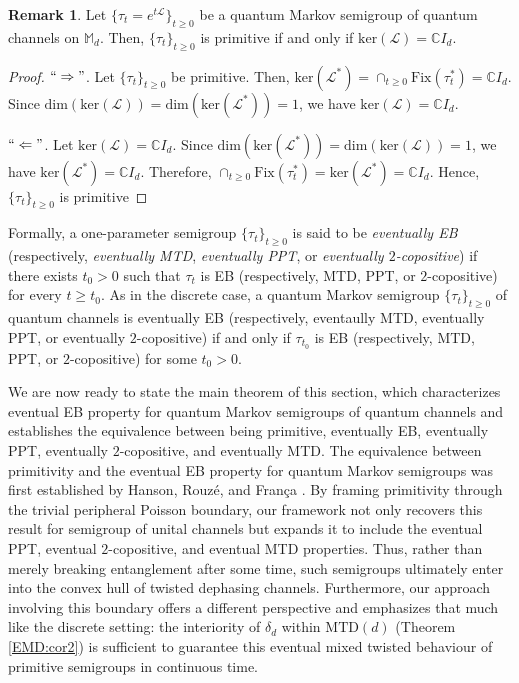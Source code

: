 \documentclass[11pt,reqno]{amsart}
\theoremstyle{definition}
\newtheorem{rmk}[defn]{Remark}
\theoremstyle{plain}
\theoremstyle{remark}
\numberwithin{equation}{section}%
\begin{document}
  
   \begin{rmk}\label{EMD:rem1}
  	Let $\{\tau_t = e^{t\mathcal{L}}\}_{t \ge 0}$ be a quantum Markov semigroup of quantum channels on $\mathbb{M}_d$. Then, $\{\tau_t\}_{t\geq 0}$ is primitive if and only if $\text{ker}(\mathcal{L})=\mathbb{C}I_d$.
  \end{rmk}
  
  
  \begin{proof}
  	$``\Rightarrow"$. Let $\{\tau_t\}_{t\geq 0}$ be primitive. Then, $\text{ker}(\mathcal{L}^*)=\cap_{t\geq 0}\text{Fix}(\tau_t^*)=\mathbb{C}I_d$. Since $\text{dim}(\text{ker}(\mathcal{L}))=\text{dim}(\text{ker}(\mathcal{L}^*))=1$, we have $\text{ker}(\mathcal{L})=\mathbb{C}I_d$.
  	
  	$``\Leftarrow"$. Let $\text{ker}(\mathcal{L})=\mathbb{C}I_d$. Since $\text{dim}(\text{ker}(\mathcal{L^*}))=\text{dim}(\text{ker}(\mathcal{L}))=1$, we have $\text{ker}(\mathcal{L}^*)=\mathbb{C}I_d$. Therefore, $\cap_{t\geq 0}\text{Fix}(\tau_t^*)=\text{ker}(\mathcal{L}^*)=\mathbb{C}I_d$. Hence, $\{\tau_t\}_{t\geq 0}$ is primitive
  \end{proof}


  	Formally, a one-parameter semigroup $\{\tau_t\}_{t\geq 0}$ is said to be \textit{eventually EB} (respectively, \textit{eventually MTD}, \textit{eventually PPT}, or \textit{eventually $2$-copositive}) if there exists $t_0>0$ such that $\tau_t$ is EB (respectively, MTD, PPT, or $2$-copositive) for every $t\geq t_0$. As in the discrete case, a quantum Markov semigroup $\{\tau_t\}_{t\geq 0}$ of quantum channels is eventually EB (respectively, eventaully MTD, eventually PPT, or eventually $2$-copositive) if and only if $\tau_{t_0}$ is EB (respectively, MTD, PPT, or $2$-copositive) for some $t_0>0$.
  
  
  We are now ready to state the main theorem of this section, which characterizes eventual EB property for quantum Markov semigroups of quantum channels and establishes the equivalence between being primitive, eventually EB, eventually PPT, eventually $2$-copositive, and eventually MTD. 
 The equivalence between primitivity and the eventual EB property for quantum Markov semigroups was first established by  Hanson, Rouz\'e, and Fran\c ca \cite[Theorem 2.1]{HRS}.  By framing primitivity through the trivial peripheral Poisson boundary, our framework not only recovers this result for semigroup of unital channels but expands it to include the eventual PPT, eventual $2$-copositive, and eventual MTD properties. Thus, rather than merely breaking entanglement after some time, such semigroups ultimately enter into the convex hull of twisted dephasing channels. Furthermore, our approach involving this boundary offers a different perspective and emphasizes that much like the discrete
setting: the interiority of $\delta_d$ within $\mathrm{MTD}(d)$ (Theorem \ref{EMD:cor2}) is sufficient to guarantee this eventual mixed twisted  behaviour of primitive semigroups in continuous time. 
  
\end{document}
